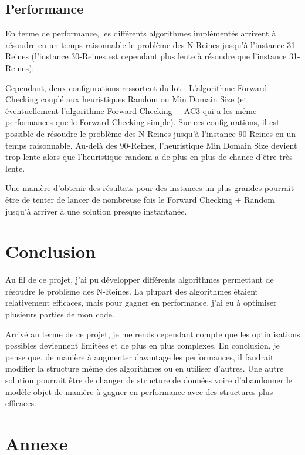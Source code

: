 \documentclass[a4paper,10pt]{article}
\begin{document}
\subsection{Performance}

En terme de performance, les différents algorithmes implémentés arrivent à résoudre en un temps raisonnable le problème des N-Reines jusqu'à l'instance 31-Reines (l'instance 30-Reines est cependant plus lente à résoudre que l'instance 31-Reines).

Cependant, deux configurations ressortent du lot : L'algorithme Forward Checking couplé aux heuristiques Random ou Min Domain Size (et éventuellement l'algorithme Forward Checking + AC3 qui a les même performances que le Forward Checking simple). Sur ces configurations, il est possible de résoudre le problème des N-Reines jusqu'à l'instance 90-Reines en un temps raisonnable. Au-delà des 90-Reines, l'heuristique Min Domain Size devient trop lente alors que l'heuristique random a de plus en plus de chance d'être très lente.

Une manière d'obtenir des résultats pour des instances un plus grandes pourrait être de tenter de lancer de nombreuse fois le Forward Checking + Random jusqu'à arriver à une solution presque instantanée.

\section{Conclusion}

Au fil de ce projet, j'ai pu développer différents algorithmes permettant de résoudre le problème des N-Reines. La plupart des algorithmes étaient relativement efficaces, mais pour gagner en performance, j'ai eu à optimiser plusieurs parties de mon code. 


Arrivé au terme de ce projet, je me rends cependant compte que les optimisations possibles deviennent limitées et de plus en plus complexes. En conclusion, je pense que, de manière à augmenter davantage les performances, il faudrait modifier la structure même des algorithmes ou en utiliser d'autres. Une autre solution pourrait être de changer de structure de données voire d'abandonner le modèle objet de manière à gagner en performance avec des structures plus efficaces.

\section{Annexe}
\end{document}
